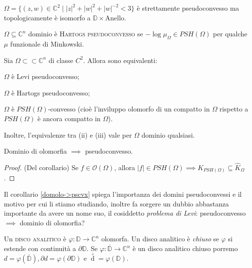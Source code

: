 \begin{ex}
  $\Omega=\{(z,w) \in \mathbb{C}^2 \mid |z|^2+|w|^2+|w|^{-2}<3\}$ è strettamente pseudoconvesso ma topologicamente è isomorfo a $\mathbb{D} \times \text{Anello}$.
\end{ex}

\begin{defn}
  $\Omega \subseteq \mathbb{C}^n$ dominio è \textsc{Hartogs pseudoconvesso} se $-\log{\mu_{\Omega}} \in PSH(\Omega)$ per qualche $\mu$ funzionale di Minkowski.
\end{defn}

\begin{thm}
  Sia $\Omega \subset\subset \mathbb{C}^n$ di classe $C^2$. Allora sono equivalenti:
  \begin{nlist}
    \item $\Omega$ è Levi pseudoconvesso;
    \item $\Omega$ è Hartogs pseudoconvesso;
    \item $\Omega$ è $PSH(\Omega)$-convesso (cioè l'inviluppo olomorfo di un compatto in $\Omega$ rispetto a $PSH(\Omega)$ è ancora compatto in $\Omega$).
  \end{nlist}
  Inoltre, l'equivalenze tra (ii) e (iii) vale per $\Omega$ dominio qualsiasi.
\end{thm}

\begin{cor} \label{domolo->pscvx}
  Dominio di olomorfia $\implies$ pseudoconvesso.
\end{cor}

\begin{proof}
  (Del corollario) Se $f \in \mathcal{O}(\Omega)$, allora $|f| \in PSH(\Omega) \implies \widehat{K}_{PSH(\Omega)} \subseteq \widehat{K}_{\Omega}$.
\end{proof}

Il corollario \ref{domolo->pscvx} spiega l'importanza dei domini pseudoconvessi e il motivo per cui li stiamo studiando, inoltre fa sorgere un dubbio abbastanza importante da avere un nome suo, il cosiddetto \textit{problema di Levi}: pseudoconvesso $\implies$ dominio di olomorfia?

\begin{defn}
  Un \textsc{disco analitico} è $\varphi:\mathbb{D} \longrightarrow \mathbb{C}^n$ olomorfa. Un disco analitico è \textit{chiuso} se $\varphi$ si estende con continuità a $\partial\mathbb{D}$. Se $\varphi:\overline{\mathbb{D}} \longrightarrow \mathbb{C}^n$ è un disco analitico chiuso porremo $d=\varphi(\overline{\mathbb{D}}), \partial d=\varphi(\partial\mathbb{D})$ e $\mathop {d}\limits^ \circ=\varphi(\mathbb{D})$.
\end{defn}

